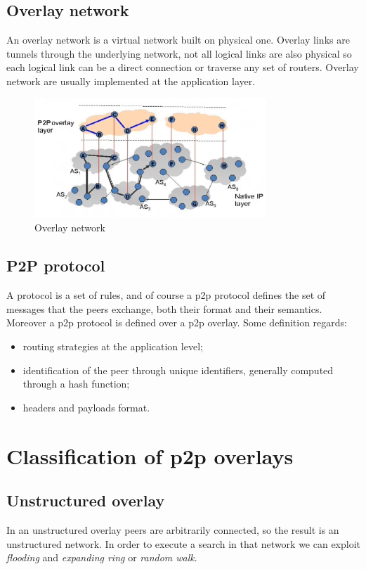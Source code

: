 \subsection{Overlay network}
An overlay network is a virtual network built on physical one.
Overlay links are tunnels through the underlying network, not all logical links are also physical so each logical link can be a direct connection or traverse any set of routers.
Overlay network are usually implemented at the application layer.

\begin{figure}[H]
    \centering
    \includegraphics[width=330px]{images/2_p2p_networks/01.png}
    \caption{Overlay network}
\end{figure}

\subsection{P2P protocol}
A protocol is a set of rules, and of course a p2p protocol defines the set of messages that the peers exchange, both their format and their semantics.
Moreover a p2p protocol is defined over a p2p overlay.
Some definition regards:
\begin{itemize}
    \item routing strategies at the application level;
    \item identification of the peer through unique identifiers, generally computed through a hash function;
    \item headers and payloads format.
\end{itemize}

\section{Classification of p2p overlays}
\subsection{Unstructured overlay}
In an unstructured overlay peers are arbitrarily connected, so the result is an unstructured network.
In order to execute a search in that network we can exploit \emph{flooding} and \emph{expanding ring} or \emph{random walk}.

